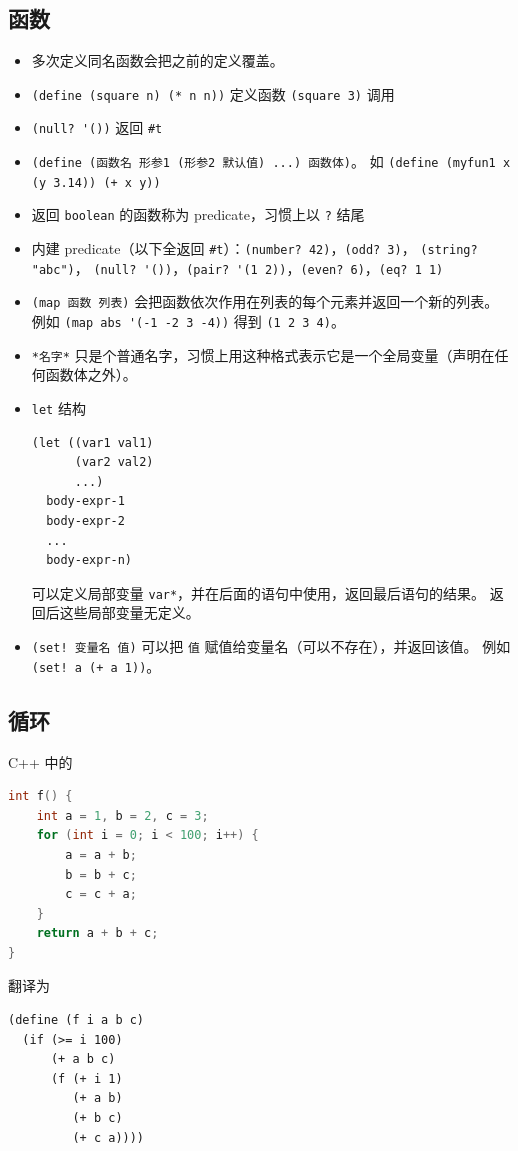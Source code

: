 \subsection{函数}
\begin{itemize}
\item 多次定义同名函数会把之前的定义覆盖。
\item \verb`(define (square n) (* n n))` 定义函数 \verb`(square 3)` 调用
\item \verb`(null? '())` 返回 \verb`#t`
\item \verb`(define (函数名 形参1 (形参2 默认值) ...) 函数体)`。 如 \verb`(define (myfun1 x (y 3.14)) (+ x y))`
\item 返回 \verb`boolean` 的函数称为 predicate，习惯上以 \verb`?` 结尾
\item 内建 predicate（以下全返回 \verb`#t`）：\verb`(number? 42)`，\verb`(odd? 3)`， \verb`(string? "abc")`， \verb`(null? '())`，\verb`(pair? '(1 2))`，\verb`(even? 6)`，\verb`(eq? 1 1)`
\item \verb`(map 函数 列表)` 会把函数依次作用在列表的每个元素并返回一个新的列表。 例如 \verb`(map abs '(-1 -2 3 -4))` 得到 \verb`(1 2 3 4)`。
\item \verb`*名字*` 只是个普通名字，习惯上用这种格式表示它是一个全局变量（声明在任何函数体之外）。
\item \verb`let` 结构
\begin{lstlisting}[language=none]
(let ((var1 val1)
      (var2 val2)
      ...)
  body-expr-1
  body-expr-2
  ...
  body-expr-n)
\end{lstlisting}
可以定义局部变量 \verb`var*`，并在后面的语句中使用，返回最后语句的结果。 返回后这些局部变量无定义。
\item \verb`(set! 变量名 值)` 可以把 \verb`值` 赋值给变量名（可以不存在），并返回该值。 例如 \verb`(set! a (+ a 1))`。
\end{itemize}


\subsection{循环}
C++ 中的
\begin{lstlisting}[language=cpp]
int f() {
    int a = 1, b = 2, c = 3;
    for (int i = 0; i < 100; i++) {
        a = a + b;
        b = b + c;
        c = c + a;
    }
    return a + b + c;
}
\end{lstlisting}
翻译为
\begin{lstlisting}[language=none]
(define (f i a b c)
  (if (>= i 100)
      (+ a b c)
      (f (+ i 1)
         (+ a b)
         (+ b c)
         (+ c a))))
\end{lstlisting}
